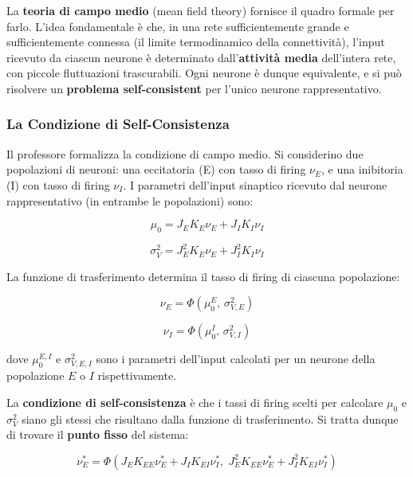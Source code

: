 La \textbf{teoria di campo medio} (mean field theory) fornisce il quadro formale per farlo. L'idea fondamentale è che, in una rete sufficientemente grande e sufficientemente connessa (il limite termodinamico della connettività), l'input ricevuto da ciascun neurone è determinato dall'\textbf{attività media} dell'intera rete, con piccole fluttuazioni trascurabili. Ogni neurone è dunque equivalente, e si può risolvere un \textbf{problema self-consistent} per l'unico neurone rappresentativo.

\subsubsection{La Condizione di Self-Consistenza}

Il professore formalizza la condizione di campo medio. Si considerino due popolazioni di neuroni: una eccitatoria (E) con tasso di firing $\nu_E$, e una inibitoria (I) con tasso di firing $\nu_I$. I parametri dell'input sinaptico ricevuto dal neurone rappresentativo (in entrambe le popolazioni) sono:

\begin{equation}
\mu_0 = J_E K_E \nu_E + J_I K_I \nu_I
\end{equation}

\begin{equation}
\sigma_V^2 = J_E^2 K_E \nu_E + J_I^2 K_I \nu_I
\end{equation}

La funzione di trasferimento determina il tasso di firing di ciascuna popolazione:

\begin{equation}
\nu_E = \Phi(\mu_0^E,\, \sigma_{V,E}^2)
\end{equation}

\begin{equation}
\nu_I = \Phi(\mu_0^I,\, \sigma_{V,I}^2)
\end{equation}

dove $\mu_0^{E,I}$ e $\sigma_{V,E,I}^2$ sono i parametri dell'input calcolati per un neurone della popolazione $E$ o $I$ rispettivamente.

La \textbf{condizione di self-consistenza} è che i tassi di firing scelti per calcolare $\mu_0$ e $\sigma_V^2$ siano gli stessi che risultano dalla funzione di trasferimento. Si tratta dunque di trovare il \textbf{punto fisso} del sistema:

\begin{equation}
\nu_E^* = \Phi\!\left(J_E K_{EE} \nu_E^* + J_I K_{EI} \nu_I^*,\; J_E^2 K_{EE} \nu_E^* + J_I^2 K_{EI} \nu_I^*\right)
\end{equation}

